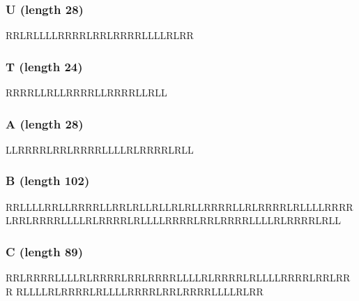 \documentclass[
  11pt,
]{article}
\newenvironment{Shaded}{}{}
\newcommand{\NormalTok}[1]{#1}
\begin{document}
\subsubsection{U (length 28)}\label{u-length-28}

\begin{Shaded}
\begin{Highlighting}[]
\NormalTok{RRLRLLLLRRRRLRRLRRRRLLLLRLRR}
\end{Highlighting}
\end{Shaded}

\subsubsection{T (length 24)}\label{t-length-24}

\begin{Shaded}
\begin{Highlighting}[]
\NormalTok{RRRRLLRLLRRRRLLRRRRLLRLL}
\end{Highlighting}
\end{Shaded}

\subsubsection{A (length 28)}\label{a-length-28}

\begin{Shaded}
\begin{Highlighting}[]
\NormalTok{LLRRRRLRRLRRRRLLLLRLRRRRLRLL}
\end{Highlighting}
\end{Shaded}

\subsubsection{B (length 102)}\label{b-length-102}

\begin{Shaded}
\begin{Highlighting}[]
\NormalTok{RRLLLLRRLLRRRRLLRRLRLLRLLRLRLLRRRRLLRLRRRRLRLLLLRRRR}
\NormalTok{LRRLRRRRLLLLRLRRRRLRLLLLRRRRLRRLRRRRLLLLRLRRRRLRLL}
\end{Highlighting}
\end{Shaded}

\subsubsection{C (length 89)}\label{c-length-89}

\begin{Shaded}
\begin{Highlighting}[]
\NormalTok{RRLRRRRLLLLRLRRRRLRRLRRRRLLLLRLRRRRLRLLLLRRRRLRRLRRR}
\NormalTok{RLLLLRLRRRRLRLLLLRRRRLRRLRRRRLLLLRLRR}
\end{Highlighting}
\end{Shaded}
\end{document}
